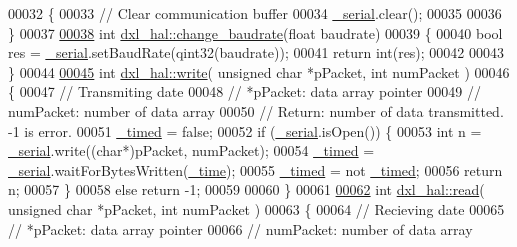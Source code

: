 \begin{DoxyCode}
00032 \{
00033     \textcolor{comment}{// Clear communication buffer}
00034     \hyperlink{a00002_a785d0e35b81d779b54869cad668f9745}{\_serial}.clear();
00035     
00036 \}
00037 
\hypertarget{a00010_source_l00038}{}\hyperlink{a00002_a0eaaa5340bc9dce73cc920dc8befe5b0}{00038} \textcolor{keywordtype}{int} \hyperlink{a00002_a0eaaa5340bc9dce73cc920dc8befe5b0}{dxl\_hal::change\_baudrate}(\textcolor{keywordtype}{float} baudrate)
00039 \{
00040     \textcolor{keywordtype}{bool} res = \hyperlink{a00002_a785d0e35b81d779b54869cad668f9745}{\_serial}.setBaudRate(qint32(baudrate));
00041     \textcolor{keywordflow}{return} int(res);
00042     
00043 \}
00044 
\hypertarget{a00010_source_l00045}{}\hyperlink{a00002_a90106970438fb0ab65852730a1c0776a}{00045} \textcolor{keywordtype}{int} \hyperlink{a00002_a90106970438fb0ab65852730a1c0776a}{dxl\_hal::write}( \textcolor{keywordtype}{unsigned} \textcolor{keywordtype}{char} *pPacket, \textcolor{keywordtype}{int} numPacket )
00046 \{
00047     \textcolor{comment}{// Transmiting date}
00048     \textcolor{comment}{// *pPacket: data array pointer}
00049     \textcolor{comment}{// numPacket: number of data array}
00050     \textcolor{comment}{// Return: number of data transmitted. -1 is error.}
00051     \hyperlink{a00002_a10d474daa3ca42b5c5ceb6558a955ca1}{\_timed} = \textcolor{keyword}{false};
00052     \textcolor{keywordflow}{if} (\hyperlink{a00002_a785d0e35b81d779b54869cad668f9745}{\_serial}.isOpen()) \{
00053         \textcolor{keywordtype}{int} n = \hyperlink{a00002_a785d0e35b81d779b54869cad668f9745}{\_serial}.write((\textcolor{keywordtype}{char}*)pPacket, numPacket);
00054         \hyperlink{a00002_a10d474daa3ca42b5c5ceb6558a955ca1}{\_timed} = \hyperlink{a00002_a785d0e35b81d779b54869cad668f9745}{\_serial}.waitForBytesWritten(\hyperlink{a00002_ae3d8733b5ca778b070218765ca0746ac}{\_time});
00055         \hyperlink{a00002_a10d474daa3ca42b5c5ceb6558a955ca1}{\_timed} = not \hyperlink{a00002_a10d474daa3ca42b5c5ceb6558a955ca1}{\_timed};
00056         \textcolor{keywordflow}{return} n;
00057     \}
00058     \textcolor{keywordflow}{else} \textcolor{keywordflow}{return} -1;
00059 
00060 \}
00061 
\hypertarget{a00010_source_l00062}{}\hyperlink{a00002_ac36331febb2eaa66303af3483795742a}{00062} \textcolor{keywordtype}{int} \hyperlink{a00002_ac36331febb2eaa66303af3483795742a}{dxl\_hal::read}( \textcolor{keywordtype}{unsigned} \textcolor{keywordtype}{char} *pPacket, \textcolor{keywordtype}{int} numPacket )
00063 \{
00064     \textcolor{comment}{// Recieving date}
00065     \textcolor{comment}{// *pPacket: data array pointer}
00066     \textcolor{comment}{// numPacket: number of data array}

\end{DoxyCode}
